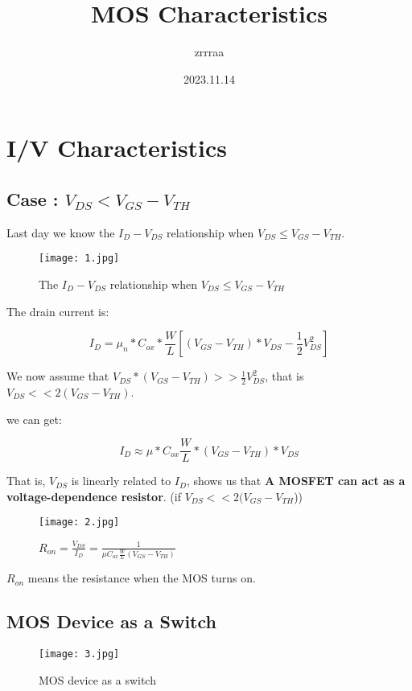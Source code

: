 \documentclass[fontset=windows]{article}
\title{\heiti\zihao{2} MOS Characteristics \uppercase\expandafter{\romannumeral2}}
\author{\songti zrrraa}
\date{2023.11.14}
\begin{document}
\maketitle
\thispagestyle{empty}

\section*{I/V Characteristics}

\subsection*{Case \uppercase\expandafter{}: $V_{DS}<V_{GS}-V_{TH}$}
Last day we know the $I_D-V_{DS}$ relationship when $V_{DS} \leq V_{GS}-V_{TH}$. 

\begin{figure}[htbp]
    \centering
    \texttt{[image: 1.jpg]}
    \captionsetup{labelformat=empty}
    \caption{The $I_D-V_{DS}$ relationship when $V_{DS} \leq V_{GS}-V_{TH}$}
    \label{1}
\end{figure}

The drain current is: 

$$I_D=\mu_{n}*C_{ox}*\frac{W}{L}[(V_{GS}-V_{TH})*V_{DS}-\frac{1}{2}V_{DS}^2]$$

We now assume that $V_{DS}*(V_{GS}-V_{TH})>>\frac{1}{2}V_{DS}^2$, that is $V_{DS}<<2(V_{GS}-V_{TH})$. 

we can get: 

$$I_D \approx \mu *C_{ox}\frac{W}{L}*(V_{GS}-V_{TH})*V_{DS}$$

That is, $V_{DS}$ is linearly related to $I_{D}$, shows us that 
\textbf{A MOSFET can act as a voltage-dependence resistor}. 
(if $V_{DS}<<2(V_{GS}-V_{TH}$))

\begin{figure}[htbp]
    \centering
    \texttt{[image: 2.jpg]}
    \captionsetup{labelformat=empty}
    \caption{$R_{on}=\frac{V_{DS}}{I_D}=\frac{1}{\mu C_{ox}\frac{W}{L}(V_{GS}-V_{TH})}$}
    \label{2}
\end{figure}

$R_{on}$ means the resistance when the MOS turns on. 

\subsection*{MOS Device as a Switch}

\begin{figure}[htbp]
    \centering
    \texttt{[image: 3.jpg]}
    \captionsetup{labelformat=empty}
    \caption{MOS device as a switch}
    \label{3}
\end{figure}
\end{document}
